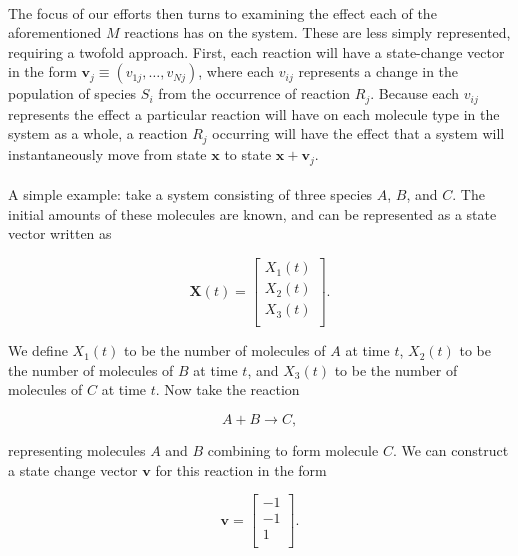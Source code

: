\documentclass[ugrad,lot,lof,openright,11pt,oneside,onehalfspace]{RUthesis}
\begin{document}
				\\
				The focus of our efforts then turns to examining the effect each of the aforementioned $M$ reactions has on the system. These are less simply represented, requiring a twofold approach. First, each reaction will have a state-change vector in the form $\mathbf{v}_j \equiv (v_{1j},\ldots,v_{Nj})$, where each $v_{ij}$ represents a change in the population of species $S_i$ from the occurrence of reaction $R_j$. Because each $v_{ij}$ represents the effect a particular reaction will have on each molecule type in the system as a whole, a reaction $R_j$ occurring will have the effect that a system will instantaneously move from state $\mathbf{x}$ to state $\mathbf{x+v}_j$.\\
				\\
				A simple example: take a system consisting of three species $A$, $B$, and $C$. The initial amounts of these molecules are known, and can be represented as a state vector written as

				\begin{equation*}
				\mathbf{X}(t) = 
				\left[
					\begin{array}{c}
					X_1(t)\\
					X_2(t)\\
					X_3(t)\\
					\end{array}
				\right].
				\end{equation*}

				\noindent
				We define $X_1(t)$ to be the number of molecules of $A$ at time $t$, $X_2(t)$ to be the number of molecules of $B$ at time $t$, and $X_3(t)$ to be the number of molecules of $C$ at time $t$. Now take the reaction

				\begin{equation*}
				A + B \rightarrow C,
				\end{equation*}

				\noindent
				representing molecules $A$ and $B$ combining to form molecule $C$. We can construct a state change vector $\mathbf{v}$ for this reaction in the form

				\begin{equation*}
				\mathbf{v} = 
				\left[
					\begin{array}{c}
					-1\\
					-1\\
					1\\
					\end{array}
				\right].
				\end{equation*}
\end{document}
